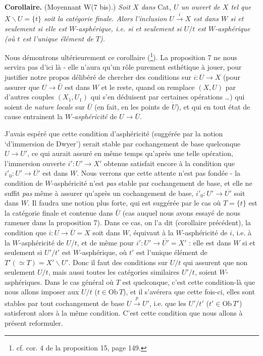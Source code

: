 \documentclass[11pt]{article}
\newcommand{\printedpage}[1]{\marginpar{\footnotesize p.~#1}}
\newcommand{\msp}[1]{\marginpar{\footnotesize [#1]}}
\newcommand{\Ob}{\mathrm{Ob}\,}
\begin{document}
\msp{page 85}

\textbf{Corollaire.} (Moyennant W(7 bis).) \textit{Soit $X$ dans} Cat\textit{, $U$ un ouvert de $X$ tel que $X\backslash U=\overline{\{t\}}$ soit la catégorie finale. Alors l’inclusion $U\xrightarrow{i}X$ est dans $W$ si et seulement si elle est $W$-asphérique, i.e. si et seulement si $U/t$ est $W$-asphérique (où $t$ est l’unique élément de $T$).}

Nous démontrons ultérieurement ce corollaire (\footnote[65]{cf. cor. 4 de la proposition 15, page 149.}). La proposition 7 ne nous servira pas d’ici là - elle n’aura qu’un rôle purement esthétique à jouer, pour justifier notre propos délibéré de chercher des conditions sur $i:U\longrightarrow X$ (pour assurer que $U\longrightarrow\bar U$ est dans $W$ et le reste, quand on remplace $(X,U)$ par d’autres couples $(X_1,U_1)$ qui s’en déduisent par certaines opérations \dots) qui
\msp{page 86}
soient de \textit{nature locale} sur $\bar U$ (en fait, en les points de $\dot U$), et qui en tout état de cause entrainent la \textit{$W$-asphéricité} de $U\longrightarrow\bar U$.

J’avais espéré que cette condition d’asphéricité (suggérée par la notion ‘d’immersion de Dwyer’) serait stable par cochangement de base quelconque $U\longrightarrow U'$, ce qui aurait assuré en même temps qu’après une telle opération, l’immersion ouverte $i':U'\longrightarrow X'$ obtenue satisfait encore à la condition que $i'_0:U'\longrightarrow\overline{U'}$ est dans $W$. Nous verrons que cette attente n’est pas fondée - la condition de $W$-asphéricité n’est \textit{pas} stable par cochangement de base, et elle ne suffit \textit{pas} même à assurer qu’après un cochangement de base, $i'_0:U'\longrightarrow\overline{U'}$ soit
\printedpage{62}
dans $W$. Il faudra une notion plus forte, qui est suggérée par le cas où $T=\{t\}$ est la catégorie finale et contenue dans $\bar U$ (cas auquel nous avons essayé de nous ramener dans la proposition 7). Dans ce cas, on l’a dit (corollaire précédent), la condition que $i:U\longrightarrow\bar U=X$ soit dans $W$, équivaut à la $W$-asphéricité de $i$, i.e. à la $W$-asphéricité de $U/t$, et de même pour $i':U'\longrightarrow\overline{U'}=X'$ : elle est dans $W$ si et seulement si $U'/t'$ est $W$-asphérique, où
\msp{page 87}
$t'$ est l’unique élément de $T'(\simeq T)=X'\backslash U'$. Donc il faut des conditions sur $U/t$ qui assurent que non seulement $U/t$, mais aussi toutes les catégories similaires $U'/t$, soient $W$-asphériques. Dans le cas général où $T$ est quelconque, c’est cette condition-là que nous allons imposer aux $U/t$ ($t\in\Ob T$), et il s’avérera que cette fois-ci, elles sont stables par tout cochangement de base $U\xrightarrow{p}U'$, i.e. que les $U'/t'$ ($t'\in\Ob T'$) satisferont alors à la même condition. C’est cette condition que nous allons à présent reformuler.
\end{document}
